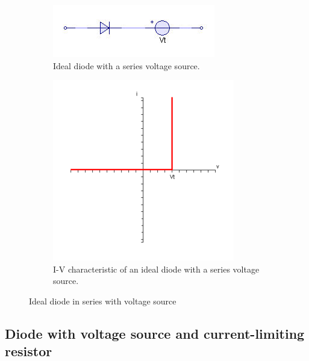 \begin{figure}[H]
  \centering
  \begin{subfigure}{.4\textwidth}
    \centering
    \includegraphics[width=\linewidth]{figures/Diode_Modelling_Image6}
    \caption{Ideal diode with a series voltage source.}
    \label{fig:}
  \end{subfigure}%
  \begin{subfigure}{.4\textwidth}
    \centering
    \includegraphics[width=\linewidth]{figures/Diode_Modelling_Image8}
    \caption{I-V characteristic of an ideal diode with a series voltage source.}
    \label{fig:}
  \end{subfigure}
  \caption{Ideal diode in series with voltage source}
  \label{fig:}
\end{figure}

\subsection{Diode with voltage source and current-limiting resistor}

